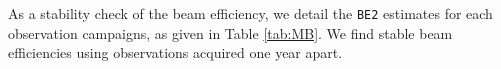 As a stability check of the beam efficiency, we detail the {\tt BE2} estimates
for each observation campaigns, as given in Table
\ref{tab:MB}. %
We find stable beam efficiencies using observations acquired one year apart.



